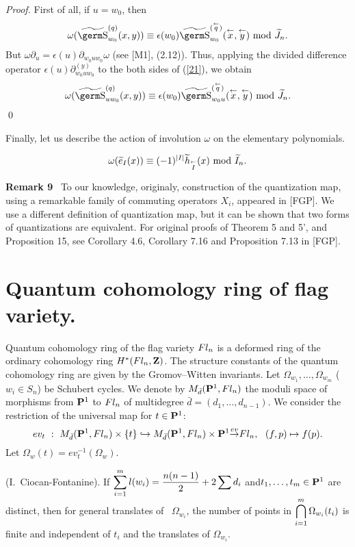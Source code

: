{{{\it Proof.} First of all, if $u=w_0$, then
\begin{equation}
\omega (\wt{\s}_{w_0}^{(q)}(x,y))\equiv\epsilon (w_0)
\wt{\s}_{w_0}^{(\covec q)}(\covec x,\covec y)~\mod \wt J_n.\label{21}
\end{equation}
But $\omega\partial_u=\epsilon (u)\partial_{w_0uw_0}\omega$ (see [M1], (2.12)).
Thus, applying the divided difference operator $\epsilon (u)
\partial_{w_0uw_0}^{(y)}$
to the both sides of (\ref{21}), we obtain
$$\omega (\wt{\s}_{uw_0}^{(q)}(x,y))\equiv\epsilon (w_0)
\wt{\s}_{w_0u}^{(\covec q)}(\covec x,\covec y)~\mod \wt J_n.
$$
\qed

Finally, let us describe the action of involution $\omega $ on the 
elementary polynomials.
\begin{pr} 
$$\omega (\wt e_I(x))\equiv (-1)^{|I|}
\wt h_{\covec I}(x)~\mod \wt I_n.
$$
\end{pr}\bigskip 
{\bf Remark 9} \ To our knowledge, originaly, construction of the 
quantization map, using a remarkable family of commuting operators $X_i$,
appeared in [FGP]. We use a different definition of quantization map, but
it can be shown that two forms of quantizations are equivalent.
For original proofs of Theorem 5 and 5', and Proposition 15,
see Corollary 4.6, Corollary 7.16 and Proposition 7.13 in [FGP]. 

\section{Quantum cohomology ring of flag variety.}

Quantum cohomology ring of the flag variety ${\hbox{$Fl_n$}}$ is a
deformed ring of 
the ordinary cohomology ring $H^*({\hbox{$Fl_n$}} ,{\bf Z})$. The structure constants of 
the quantum cohomology ring are given by the Gromov--Witten invariants. Let 
$\Omega_{w_1},\ldots ,\Omega_{w_m}$ ($w_i\in S_n$) be Schubert cycles. We 
denote by $M_{\bar d}({\bf P}^1,Fl_n)$ the moduli space of morphisms from 
${\bf P}^1$ to $\hbox{$Fl_n$}$ of multidegree $\bar{d}=(d_1,\ldots ,d_{n-1})$. We 
consider the restriction of the universal map for $t\in{\bf P}^1$:
$$ev_t~:~M_{\bar d}({\bf P}^1,\Fl )\times\{ t\}\hookrightarrow 
M_{\bar d}({\bf P}^1,\Fl )\times{\bf P}^1{\buildrel
ev\over\rightarrow}
\Fl ,~~(f,p)\mapsto f(p).
$$
Let $\Omega_w(t)=ev_t^{-1}(\Omega_w)$.

\begin{th} \mbox{(I.~Ciocan-Fontanine)}. If
$\displaystyle\sum_{i=1}^ml(w_i)=\frac{n(n-1)}{2}
+2\sum d_i$ and\break $t_1,\ldots ,t_m\in{\bf P}^1$ are distinct, then for 
general translates of ~$\Omega_{w_i}$, the number of points in 
$\displaystyle\bigcap_{i=1}^m\Omega_{w_i}(t_i)$ is finite and independent of $t_i$ and 
the translates of $\Omega_{w_i}$.
\end{th}

}}
